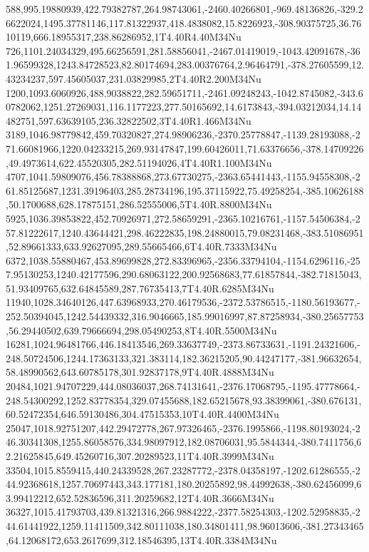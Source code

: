588,995.19880939,422.79382787,264.98743061,-2460.40266801,-969.48136826,-329.26622024,1495.37781146,117.81322937,418.4838082,15.8226923,-308.90375725,36.7610119,666.18955317,238.86286952,1T4.40R4.40M34Nu
726,1101.24034329,495.66256591,281.58856041,-2467.01419019,-1043.42091678,-361.96599328,1243.84728523,82.80174694,283.00376764,2.96464791,-378.27605599,12.43234237,597.45605037,231.03829985,2T4.40R2.200M34Nu
1200,1093.6060926,488.9038822,282.59651711,-2461.09248243,-1042.8745082,-343.60782062,1251.27269031,116.1177223,277.50165692,14.6173843,-394.03212034,14.14482751,597.63639105,236.32822502,3T4.40R1.466M34Nu
3189,1046.98779842,459.70320827,274.98906236,-2370.25778847,-1139.28193088,-271.66081966,1220.04233215,269.93147847,199.60426011,71.63376656,-378.14709226,49.4973614,622.45520305,282.51194026,4T4.40R1.100M34Nu
4707,1041.59809076,456.78388868,273.67730275,-2363.65441443,-1155.94558308,-261.85125687,1231.39196403,285.28734196,195.37115922,75.49258254,-385.10626188,50.1700688,628.17875151,286.52555006,5T4.40R.8800M34Nu
5925,1036.39853822,452.70926971,272.58659291,-2365.10216761,-1157.54506384,-257.81222617,1240.43644421,298.46222835,198.24880015,79.08231468,-383.51086951,52.89661333,633.92627095,289.55665466,6T4.40R.7333M34Nu
6372,1038.55880467,453.89699828,272.83396965,-2356.33794104,-1154.6296116,-257.95130253,1240.42177596,290.68063122,200.92568683,77.61857844,-382.71815043,51.93409765,632.64845589,287.76735413,7T4.40R.6285M34Nu
11940,1028.34640126,447.63968933,270.46179536,-2372.53786515,-1180.56193677,-252.50394045,1242.54439332,316.9046665,185.99016997,87.87258934,-380.25657753,56.29440502,639.79666694,298.05490253,8T4.40R.5500M34Nu
16281,1024.96481766,446.18413546,269.33637749,-2373.86733631,-1191.24321606,-248.50724506,1244.17363133,321.383114,182.36215205,90.44247177,-381.96632654,58.48990562,643.60785178,301.92837178,9T4.40R.4888M34Nu
20484,1021.94707229,444.08036037,268.74131641,-2376.17068795,-1195.47778664,-248.54300292,1252.83778354,329.07455688,182.65215678,93.38399061,-380.676131,60.52472354,646.59130486,304.47515353,10T4.40R.4400M34Nu
25047,1018.92751207,442.29472778,267.97326465,-2376.1995866,-1198.80193024,-246.30341308,1255.86058576,334.98097912,182.08706031,95.5844344,-380.7411756,62.21625845,649.45260716,307.20289523,11T4.40R.3999M34Nu
33504,1015.8559415,440.24339528,267.23287772,-2378.04358197,-1202.61286555,-244.92368618,1257.70697443,343.177181,180.20255892,98.44992638,-380.62456099,63.99412212,652.52836596,311.20259682,12T4.40R.3666M34Nu
36327,1015.41793703,439.81321316,266.9884222,-2377.58254303,-1202.52958835,-244.61441922,1259.11411509,342.80111038,180.34801411,98.96013606,-381.27343465,64.12068172,653.2617699,312.18546395,13T4.40R.3384M34Nu
